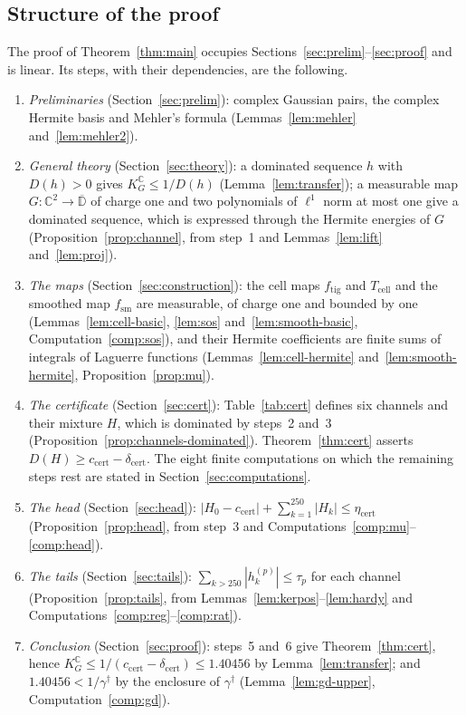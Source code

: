 \documentclass[11pt,reqno]{amsart}
\theoremstyle{definition}
\numberwithin{equation}{section}
\newcommand{\C}{\mathbb{C}}
\newcommand{\D}{\mathbb{D}}
\newcommand{\KGC}{K_G^{\C}}
\newcommand{\gd}{\gamma^\dagger}
\newcommand{\Tcell}{T_{\mathrm{cell}}}
\newcommand{\ftig}{f_{\mathrm{tig}}}
\newcommand{\fsm}{f_{\mathrm{sm}}}
\newcommand{\ccert}{c_{\mathrm{cert}}}
\newcommand{\dcert}{\delta_{\mathrm{cert}}}
\begin{document}
\subsection{Structure of the proof}\label{sec:structure}
The proof of Theorem~\ref{thm:main} occupies Sections~\ref{sec:prelim}--\ref{sec:proof} and is linear. Its steps, with their dependencies, are the following.
\begin{enumerate}
  \item \emph{Preliminaries} (Section~\ref{sec:prelim}): complex Gaussian pairs, the complex Hermite basis and Mehler's formula (Lemmas~\ref{lem:mehler} and~\ref{lem:mehler2}).
  \item \emph{General theory} (Section~\ref{sec:theory}): a dominated sequence $h$ with $D(h)>0$ gives $\KGC\le1/D(h)$ (Lemma~\ref{lem:transfer}); a measurable map $G:\C^2\to\overline{\D}$ of charge one and two polynomials of $\ell^1$ norm at most one give a dominated sequence, which is expressed through the Hermite energies of $G$ (Proposition~\ref{prop:channel}, from step~1 and Lemmas~\ref{lem:lift} and~\ref{lem:proj}).
  \item \emph{The maps} (Section~\ref{sec:construction}): the cell maps $\ftig$ and $\Tcell$ and the smoothed map $\fsm$ are measurable, of charge one and bounded by one (Lemmas~\ref{lem:cell-basic}, \ref{lem:sos} and~\ref{lem:smooth-basic}, Computation~\ref{comp:sos}), and their Hermite coefficients are finite sums of integrals of Laguerre functions (Lemmas~\ref{lem:cell-hermite} and~\ref{lem:smooth-hermite}, Proposition~\ref{prop:mu}).
  \item \emph{The certificate} (Section~\ref{sec:cert}): Table~\ref{tab:cert} defines six channels and their mixture $H$, which is dominated by steps~2 and~3 (Proposition~\ref{prop:channels-dominated}). Theorem~\ref{thm:cert} asserts $D(H)\ge\ccert-\dcert$. The eight finite computations on which the remaining steps rest are stated in Section~\ref{sec:computations}.
  \item \emph{The head} (Section~\ref{sec:head}): $|H_0-\ccert|+\sum_{k=1}^{250}|H_k|\le\eta_{\mathrm{cert}}$ (Proposition~\ref{prop:head}, from step~3 and Computations~\ref{comp:mu}--\ref{comp:head}).
  \item \emph{The tails} (Section~\ref{sec:tails}): $\sum_{k>250}|h^{(p)}_k|\le\tau_p$ for each channel (Proposition~\ref{prop:tails}, from Lemmas~\ref{lem:kerpos}--\ref{lem:hardy} and Computations~\ref{comp:reg}--\ref{comp:rat}).
  \item \emph{Conclusion} (Section~\ref{sec:proof}): steps~5 and~6 give Theorem~\ref{thm:cert}, hence $\KGC\le1/(\ccert-\dcert)\le1.40456$ by Lemma~\ref{lem:transfer}; and $1.40456<1/\gd$ by the enclosure of $\gd$ (Lemma~\ref{lem:gd-upper}, Computation~\ref{comp:gd}).
\end{enumerate}
\end{document}
